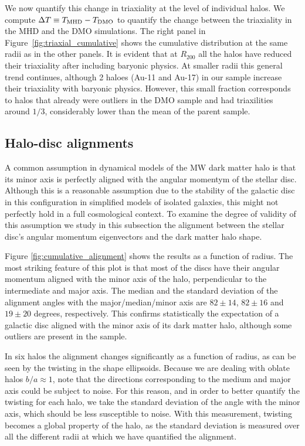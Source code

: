 \documentclass[usenatbib]{mnras}
\begin{document}
We now quantify this change in triaxiality at the level of individual halos.
We compute $\Delta T\equiv T_{\rm MHD}-T_{\rm DMO}$ to quantify the
change between the triaxiality in the MHD and the DMO simulations.
The right panel in Figure~\ref{fig:triaxial_cumulative} shows
the cumulative distribution at the same radii as in the other panels.
It is evident that at $R_{200}$ all the halos have
reduced their triaxiality after including baryonic physics.
At smaller radii this general trend continues, although 2 haloes
(Au-11 and Au-17)  in our sample increase their triaxiality with baryonic physics. 
However, this small fraction corresponds to halos that already were
outliers in the DMO sample and had triaxilities around $1/3$,
considerably lower than the mean of the parent sample.


\subsection{Halo-disc alignments}

A common assumption in dynamical models of the MW dark matter halo is that
its minor axis is perfectly aligned with the angular momentym of the
stellar disc. 
Although this is a reasonable assumption due to the stability of
the galactic disc in this configuration in simplified models of isolated galaxies, this
might not perfectly hold in a full cosmological context. 
To examine the degree of validity of this assumption we study in this
subsection the alignment between the stellar disc's angular momentum
eigenvectors and the dark matter halo shape.

Figure \ref{fig:cumulative_alignment} shows the
results as a function of radius.
The most striking feature of this plot is that most of the discs have
their angular momentum aligned with the minor axis of the halo,
perpendicular to the intermediate and major axis. 
The median and the standard deviation of the alignment angles with
the major/median/minor axis are $82\pm14$, $82\pm16$ and $19\pm20$
degrees, respectively.
This confirms statistically the expectation of a galactic disc aligned
with the minor axis of its dark matter halo, although some outliers
are present in the sample.

In six halos the alignment changes significantly as a
function of radius,  
as  can be seen by the twisting in the shape ellipsoids. 
Because we are dealing with oblate halos $b/a\approx 1$, note that the
directions corresponding to the medium and major axis could be subject
to noise. 
For this reason, and in order to better quantify the twisting for each
halo, we take the standard deviation of the angle with the minor
axis, which should be less susceptible to noise.
With this measurement, twisting becomes a global property of the halo,
as the standard deviation is measured over all the different radii at
which we have quantified the alignment.
\end{document}
